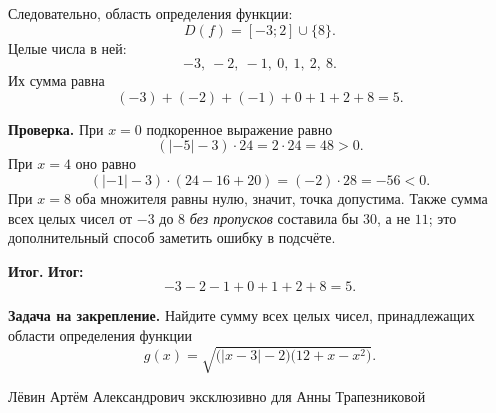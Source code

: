 \documentclass[a4paper,12pt]{article}
\newcommand{\labeltext}[1]{\par\noindent\textbf{\color{ink}#1}\quad}
\newcommand{\result}{\textbf{\color{accent}Итог:}\ }
\begin{document}
Следовательно, область определения функции:
\[
\boxed{D(f)=[-3;2]\cup\{8\}}.
\]
Целые числа в ней:
\[
-3,\ -2,\ -1,\ 0,\ 1,\ 2,\ 8.
\]
Их сумма равна
\[
(-3)+(-2)+(-1)+0+1+2+8=5.
\]

\labeltext{Проверка.}
При $x=0$ подкоренное выражение равно
\[
(|-5|-3)\cdot24=2\cdot24=48>0.
\]
При $x=4$ оно равно
\[
(|-1|-3)\cdot(24-16+20)=(-2)\cdot28=-56<0.
\]
При $x=8$ оба множителя равны нулю, значит, точка допустима. Также сумма всех целых чисел от $-3$ до $8$ \emph{без пропусков} составила бы $30$, а не $11$; это дополнительный способ заметить ошибку в подсчёте.

\labeltext{Итог.} \result
\[
\boxed{-3-2-1+0+1+2+8=5}.
\]

\labeltext{Задача на закрепление.}
Найдите сумму всех целых чисел, принадлежащих области определения функции
\[
g(x)=\sqrt{\bigl(|x-3|-2\bigr)\bigl(12+x-x^2\bigr)}.
\]

\vfill
\begin{center}
{\footnotesize\color{softgray}Лёвин Артём Александрович эксклюзивно для Анны Трапезниковой}
\end{center}
\end{document}
